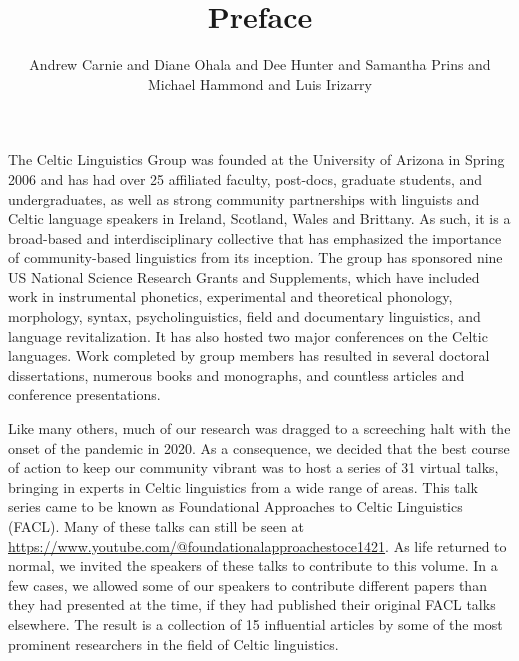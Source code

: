 \documentclass[output=paper]{langsci/langscibook}
\title{Preface}
\author{Andrew Carnie and         Diane Ohala and         Dee Hunter and         Samantha Prins and          Michael Hammond and         Luis Irizarry\affiliation{University of Arizona}
        }
\begin{document}
\maketitle

\noindent 
The Celtic Linguistics Group was founded at the University of Arizona in Spring 2006 and has had over 25 affiliated faculty, post-docs, graduate students, and undergraduates, as well as strong community partnerships with linguists and Celtic language speakers in Ireland, Scotland, Wales and Brittany. As such, it is a broad-based and interdisciplinary collective that has emphasized the importance of community-based linguistics from its inception. The group has sponsored nine US National Science Research Grants and Supplements, which have included work in instrumental phonetics, experimental and theoretical phonology, morphology, syntax, psycholinguistics, field and documentary linguistics, and language revitalization. It has also hosted two major conferences on the Celtic languages. Work completed by group members has resulted in several doctoral dissertations, numerous books and monographs, and countless articles and conference presentations. 

Like many others, much of our research was dragged to a screeching halt with the onset of the pandemic in 2020. As a consequence, we decided that the best course of action to keep our community vibrant was to host a series of 31 virtual talks, bringing in experts in Celtic linguistics from a wide range of areas. This talk series came to be known as Foundational Approaches to Celtic Linguistics (FACL). Many of these talks can still be seen at \url{https://www.youtube.com/@foundationalapproachestoce1421}. As life returned to normal, we invited the speakers of these talks to contribute to this volume. In a few cases, we allowed some of our speakers to contribute different papers than they had presented at the time, if they had published their original FACL talks elsewhere. The result is a collection of 15 influential articles by some of the most prominent researchers in the field of Celtic linguistics.
\end{document}
